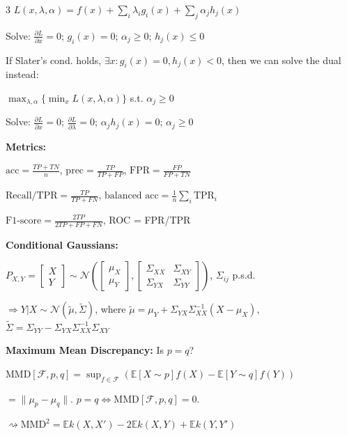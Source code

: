 \documentclass[10pt,landscape,a4paper]{article}
\newcommand{\E}{\mathbb{E}}
\begin{document}
\begin{multicols}{3}
$L(x,\lambda,\alpha) = f(x) + \sum_i \lambda_i g_i(x) + \sum_j \alpha_j h_j(x)$

Solve: $\frac{\partial L}{\partial x} = 0$; $g_i(x) = 0$; $\alpha_j \geq 0$; $h_j(x) \leq 0$

If Slater's cond. holds, $\exists x : g_i(x) = 0, h_j(x) < 0$, then we can solve the dual instead:

$\max_{\lambda,\alpha}\{\min_x L(x,\lambda,\alpha)\}$ s.t. $\alpha_j \geq 0$

Solve: $\frac{\partial L}{\partial x} = 0$; $\frac{\partial L}{\partial \lambda} = 0$; $\alpha_j h_j(x) = 0$; $\alpha_j \geq 0$

\textbf{Metrics:}

$\text{acc} = \frac{TP+TN}{n}$, $\text{prec} = \frac{TP}{TP+FP}$, $\text{FPR} = \frac{FP}{FP+TN}$

$\text{Recall/TPR} = \frac{TP}{TP+FN}$, $\text{balanced acc} = \frac{1}{n}\sum_i \text{TPR}_i$

$\text{F1-score} = \frac{2TP}{2TP+FP+FN}$, ROC = FPR/TPR

\textbf{Conditional Gaussians:}

$P_{X,Y} = \begin{bmatrix} X \\ Y \end{bmatrix} \sim \mathcal{N}\left(\begin{bmatrix} \mu_X \\ \mu_Y \end{bmatrix}, \begin{bmatrix} \Sigma_{XX} & \Sigma_{XY} \\ \Sigma_{YX} & \Sigma_{YY} \end{bmatrix}\right)$, $\Sigma_{ij}$ p.s.d.

$\Rightarrow Y|X \sim \mathcal{N}(\tilde{\mu}, \tilde{\Sigma})$, where $\tilde{\mu} = \mu_Y + \Sigma_{YX}\Sigma_{XX}^{-1}(X - \mu_X)$, $\tilde{\Sigma} = \Sigma_{YY} - \Sigma_{YX}\Sigma_{XX}^{-1}\Sigma_{XY}$

\textbf{Maximum Mean Discrepancy:} Is $p = q$?

$\text{MMD}[\mathcal{F}, p, q] = \sup_{f \in \mathcal{F}} (\E[X \sim p]{f(X)} - \E[Y \sim q]{f(Y)})$

$= \|\mu_p - \mu_q\|$. $p = q \Leftrightarrow \text{MMD}[\mathcal{F}, p, q] = 0$.

$\rightsquigarrow \text{MMD}^2 = \E{k(X,X')} - 2\E{k(X,Y)} + \E{k(Y,Y')}$

\end{multicols}
\end{document}
